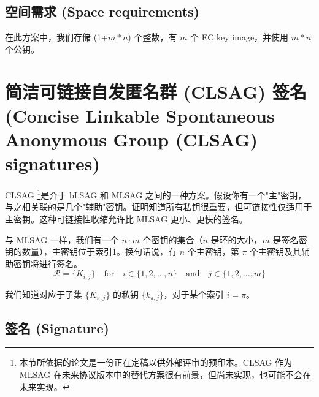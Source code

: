 \subsection*{空间需求 (Space requirements)}

在此方案中，我们存储 (1+$m*n$) 个整数，有 $m$ 个 EC key image，并使用 $m*n$ 个公钥。



\section{简洁可链接自发匿名群 (CLSAG) 签名 (Concise Linkable Spontaneous Anonymous Group (CLSAG) signatures)}
\label{sec:CLSAG}

CLSAG \cite{MRL-0011-CLSAG}\footnote{本节所依据的论文是一份正在定稿以供外部评审的预印本。CLSAG 作为 MLSAG 在未来协议版本中的替代方案很有前景，但尚未实现，也可能不会在未来实现。}是介于 bLSAG 和 MLSAG 之间的一种方案。假设你有一个"主"密钥，与之相关联的是几个"辅助"密钥。证明知道所有私钥很重要，但可链接性仅适用于主密钥。这种可链接性收缩允许比 MLSAG 更小、更快的签名。

与 MLSAG 一样，我们有一个 \(n \cdot m\) 个密钥的集合（$n$ 是环的大小，$m$ 是签名密钥的数量），主密钥位于索引1。换句话说，有 $n$ 个主密钥，第 $\pi$ 个主密钥及其辅助密钥将进行签名。\vspace{.175cm}
\[\mathcal{R} = \{K_{i,j}\}  \quad \textrm{for} \quad  i \in \{1, 2, ..., n\} \quad \textrm{and} \quad j \in \{1, 2, ..., m\}\]

我们知道对应于子集 \(\{K_{\pi, j}\}\) 的私钥 \(\{k_{\pi, j}\}\)，对于某个索引 \(i = \pi\)。


\subsection*{签名 (Signature)}

